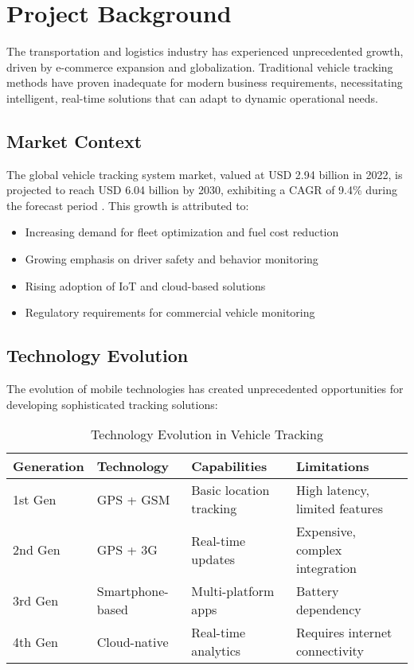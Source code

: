 \section{Project Background}
\label{sec:project_background}

The transportation and logistics industry has experienced unprecedented growth, driven by e-commerce expansion and globalization. Traditional vehicle tracking methods have proven inadequate for modern business requirements, necessitating intelligent, real-time solutions that can adapt to dynamic operational needs.

\subsection{Market Context}
The global vehicle tracking system market, valued at USD 2.94 billion in 2022, is projected to reach USD 6.04 billion by 2030, exhibiting a CAGR of 9.4\% during the forecast period \cite{market_research_2023}. This growth is attributed to:

\begin{itemize}
    \item Increasing demand for fleet optimization and fuel cost reduction
    \item Growing emphasis on driver safety and behavior monitoring
    \item Rising adoption of IoT and cloud-based solutions
    \item Regulatory requirements for commercial vehicle monitoring
\end{itemize}

\subsection{Technology Evolution}
The evolution of mobile technologies has created unprecedented opportunities for developing sophisticated tracking solutions:

\begin{table}[H]
    \centering
    \caption{Technology Evolution in Vehicle Tracking}
    \label{tab:tech_evolution}
    \begin{tabular}{@{}llll@{}}
        \toprule
        \textbf{Generation} & \textbf{Technology} & \textbf{Capabilities} & \textbf{Limitations} \\
        \midrule
        1st Gen & GPS + GSM & Basic location tracking & High latency, limited features \\
        2nd Gen & GPS + 3G & Real-time updates & Expensive, complex integration \\
        3rd Gen & Smartphone-based & Multi-platform apps & Battery dependency \\
        4th Gen & Cloud-native & Real-time analytics & Requires internet connectivity \\
        \bottomrule
    \end{tabular}
\end{table}

